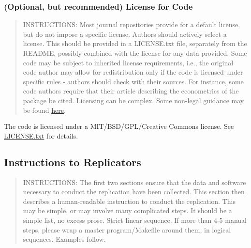 \documentclass[
]{article}
\begin{document}
\hypertarget{optional-but-recommended-license-for-code}{%
\subsubsection{(Optional, but recommended) License for
Code}\label{optional-but-recommended-license-for-code}}

\begin{quote}
INSTRUCTIONS: Most journal repositories provide for a default license,
but do not impose a specific license. Authors should actively select a
license. This should be provided in a LICENSE.txt file, separately from
the README, possibly combined with the license for any data provided.
Some code may be subject to inherited license requirements, i.e., the
original code author may allow for redistribution only if the code is
licensed under specific rules - authors should check with their sources.
For instance, some code authors require that their article describing
the econometrics of the package be cited. Licensing can be complex. Some
non-legal guidance may be found
\href{https://social-science-data-editors.github.io/guidance/Licensing_guidance.html}{here}.
\end{quote}

The code is licensed under a MIT/BSD/GPL/Creative Commons license. See
\href{https://social-science-data-editors.github.io/template_README/LICENSE.txt}{LICENSE.txt}
for details.

\hypertarget{instructions-to-replicators}{%
\subsection{Instructions to
Replicators}\label{instructions-to-replicators}}

\begin{quote}
INSTRUCTIONS: The first two sections ensure that the data and software
necessary to conduct the replication have been collected. This section
then describes a human-readable instruction to conduct the replication.
This may be simple, or may involve many complicated steps. It should be
a simple list, no excess prose. Strict linear sequence. If more than 4-5
manual steps, please wrap a master program/Makefile around them, in
logical sequences. Examples follow.
\end{quote}
\end{document}
